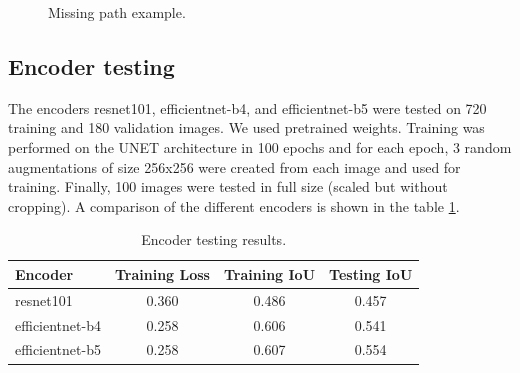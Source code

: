 \documentclass[12pt]{article}
\begin{document}
\begin{figure}[H]
    \centering
    \caption{Missing path example.}
    \label{missing_path}
\end{figure}


\subsection{Encoder testing}
The encoders resnet101, efficientnet-b4, and efficientnet-b5 were tested on 720 training and 180 validation images. We used pretrained weights. Training was performed on the UNET architecture in 100 epochs and for each epoch, 3 random augmentations of size 256x256 were created from each image and used for training. Finally, 100 images were tested in full size (scaled but without cropping). A comparison of the different encoders is shown in the table \ref{table_encoder_tests}.

\begin{table}[H]
    \centering
    \begin{tabular}{|l|c|c|c|}
        \hline
         Encoder & Training Loss & Training IoU & Testing IoU \\ \hline
         resnet101 & 0.360 & 0.486 & 0.457 \\
         efficientnet-b4 & 0.258  & 0.606 & 0.541  \\
         efficientnet-b5 & 0.258 & 0.607 & 0.554 \\
         \hline
    \end{tabular}
    \caption{Encoder testing results.}
    \label{table_encoder_tests}
\end{table}
\end{document}
